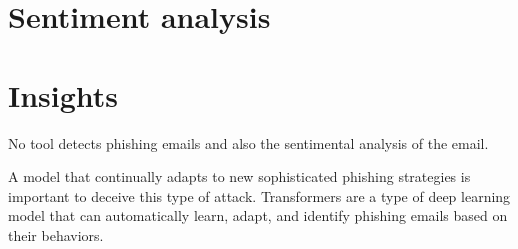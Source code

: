 \section{Sentiment analysis}



\section{Insights}

No tool detects phishing emails and also the sentimental analysis of the email.

A model that continually adapts to new sophisticated phishing strategies is important to deceive this type of attack. Transformers are a type of deep learning model that can automatically learn, adapt, and identify phishing emails based on their behaviors.